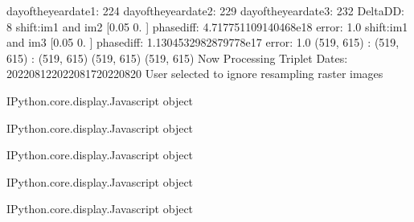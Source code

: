\documentclass[letterpaper,10pt]{sphinxmanual}
\begin{document}
\begin{sphinxVerbatim}[commandchars=\\\{\}]
day\PYGZus{}of\PYGZus{}the\PYGZus{}year\PYGZus{}date1:  224
\PYGZhy{}\PYGZhy{}\PYGZhy{}\PYGZhy{}\PYGZhy{}\PYGZhy{}\PYGZhy{}\PYGZhy{}\PYGZhy{}\PYGZhy{}\PYGZhy{}\PYGZhy{}\PYGZhy{}\PYGZhy{}\PYGZhy{}\PYGZhy{}\PYGZhy{}\PYGZhy{}\PYGZhy{}\PYGZhy{}\PYGZhy{}
day\PYGZus{}of\PYGZus{}the\PYGZus{}year\PYGZus{}date2:  229
\PYGZhy{}\PYGZhy{}\PYGZhy{}\PYGZhy{}\PYGZhy{}\PYGZhy{}\PYGZhy{}\PYGZhy{}\PYGZhy{}\PYGZhy{}\PYGZhy{}\PYGZhy{}\PYGZhy{}\PYGZhy{}\PYGZhy{}\PYGZhy{}\PYGZhy{}\PYGZhy{}\PYGZhy{}\PYGZhy{}\PYGZhy{}
day\PYGZus{}of\PYGZus{}the\PYGZus{}year\PYGZus{}date3:  232
\PYGZhy{}\PYGZhy{}\PYGZhy{}\PYGZhy{}\PYGZhy{}\PYGZhy{}\PYGZhy{}\PYGZhy{}\PYGZhy{}\PYGZhy{}\PYGZhy{}\PYGZhy{}\PYGZhy{}\PYGZhy{}\PYGZhy{}\PYGZhy{}\PYGZhy{}\PYGZhy{}\PYGZhy{}\PYGZhy{}\PYGZhy{}
Delta\PYGZus{}DD: 8
shift:im1 and im2 [\PYGZhy{}0.05  0.  ] phasediff: 4.717751109140468e\PYGZhy{}18 error: 1.0
shift:im1 and im3 [\PYGZhy{}0.05  0.  ] phasediff: \PYGZhy{}1.1304532982879778e\PYGZhy{}17 error: 1.0
(519, 615) :  (519, 615) :  (519, 615)
(519, 615)
(519, 615)
Now Processing Triplet Dates:  20220812\PYGZhy{}20220817\PYGZhy{}20220820
 User selected to ignore resampling raster images 



\PYGZlt{}IPython.core.display.Javascript object\PYGZgt{}
\end{sphinxVerbatim}



\begin{sphinxVerbatim}[commandchars=\\\{\}]
\PYGZlt{}IPython.core.display.Javascript object\PYGZgt{}
\end{sphinxVerbatim}



\begin{sphinxVerbatim}[commandchars=\\\{\}]
\PYGZlt{}IPython.core.display.Javascript object\PYGZgt{}
\end{sphinxVerbatim}



\begin{sphinxVerbatim}[commandchars=\\\{\}]
\PYGZlt{}IPython.core.display.Javascript object\PYGZgt{}
\end{sphinxVerbatim}



\begin{sphinxVerbatim}[commandchars=\\\{\}]
\PYGZlt{}IPython.core.display.Javascript object\PYGZgt{}
\end{sphinxVerbatim}
\end{document}
